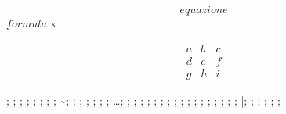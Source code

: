 \begin{equation}
equazione
\label{etichetta}
\end{equation}
\( formula\)
\text  %
{\color{red}x}  %

\[
\begin{matrix}
  a & b & c \\
  d & e & f \\
  g & h & i
\end{matrix}
\]

\pm; \mp; \ll; \gg; \leq; \geq; \equiv; \propto; \sim; \approx; \neq
\diamond; \bigcirc; \bullet; \circ; \cdot; \otimes
\dots; \times; \infty; \forall; \in; \cos; \sin; \lim; \tan; 
\uparrow; \downarrow; \partial; \nabla; 
\boldsymbol{}
\hat{}; \dot{}; \overrightarrow{}; \overline{}; \widehat{}; \tilde{}
\bar{}; \ddot{}; \vec{}; \underline{}
\binom{}{}
\sum; \int; \prod; 
